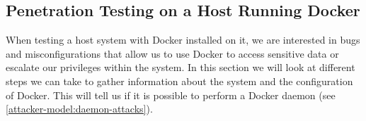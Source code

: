 \subsection{Penetration Testing on a Host Running Docker}\label{subsection:testing-host}
When testing a host system with Docker installed on it, we are interested in bugs and misconfigurations that allow us to use Docker to access sensitive data or escalate our privileges within the system. In this section we will look at different steps we can take to gather information about the system and the configuration of Docker. This will tell us if it is possible to perform a Docker daemon (see \autoref{attacker-model:daemon-attacks}).






